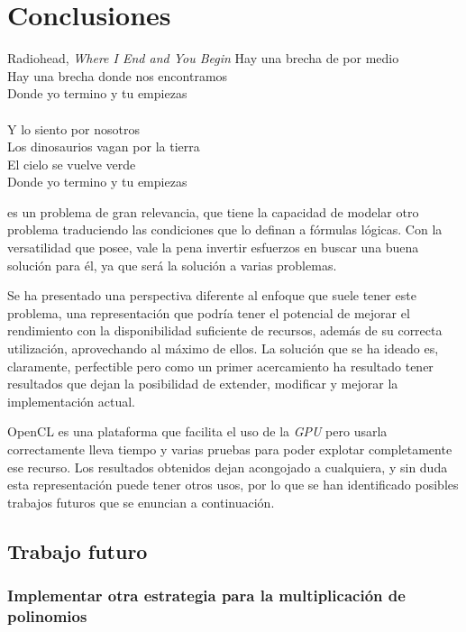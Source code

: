 \chapter{Conclusiones}

\begin{chapquote}{Radiohead, \textit{Where I End and You Begin}}
\noindent
Hay una brecha de por medio\\
Hay una brecha donde nos encontramos\\
Donde yo termino y tu empiezas\\
\\
Y lo siento por nosotros\\
Los dinosaurios vagan por la tierra\\
El cielo se vuelve verde\\
Donde yo termino y tu empiezas
\end{chapquote}

\sat es un problema de gran relevancia, que tiene la capacidad de modelar otro problema traduciendo las condiciones que lo definan a fórmulas lógicas. Con la versatilidad que posee, vale la pena invertir esfuerzos en buscar una buena solución para él, ya que será la solución a varias problemas.

Se ha presentado una perspectiva diferente al enfoque que suele tener este problema, una representación que podría tener el potencial de mejorar el rendimiento con la disponibilidad suficiente de recursos, además de su correcta utilización, aprovechando al máximo de ellos. La solución que se ha ideado es, claramente, perfectible pero como un primer acercamiento ha resultado tener resultados que dejan la posibilidad de extender, modificar y mejorar la implementación actual.

OpenCL es una plataforma que facilita el uso de la \textit{GPU} pero usarla correctamente lleva tiempo y varias pruebas para poder explotar completamente ese recurso. Los resultados obtenidos dejan acongojado a cualquiera, y sin duda esta representación puede tener otros usos, por lo que se han identificado posibles trabajos futuros que se enuncian a continuación.

\section{Trabajo futuro}

\subsection{Implementar otra estrategia para la multiplicación de polinomios}

